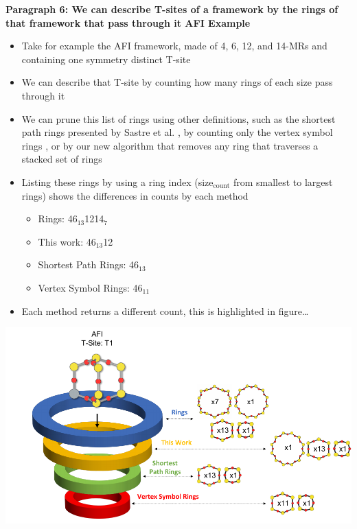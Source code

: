 \documentclass[11pt]{article}
\begin{document}
\textbf{\textbf{Paragraph 6: We can describe T-sites of a framework by the rings of that framework that pass through it AFI Example}}
\begin{itemize}
\item Take for example the AFI framework, made of 4, 6, 12, and 14-MRs and containing one symmetry distinct T-site
\item We can describe that T-site by counting how many rings of each size pass through it
\item We can prune this list of rings using other definitions, such as the shortest path rings presented by Sastre et al. \cite{sastre-topological-2009}, by counting only the vertex symbol rings \cite{okeeffe-vertex-1997}, or by our new algorithm that removes any ring that traverses a stacked set of rings
\item Listing these rings by using a ring index (size\(_{\text{count}}\) from smallest to largest rings) \cite{sastre-topological-2009} shows the differences in counts by each method
\begin{itemize}
\item Rings: 4\textbullet{}6\(_{\text{13}}\)\textbullet{}12\textbullet{}14\(_{\text{7}}\)
\item This work: 4\textbullet{}6\(_{\text{13}}\)\textbullet{}12
\item Shortest Path Rings: 4\textbullet{}6\(_{\text{13}}\)
\item Vertex Symbol Rings: 4\textbullet{}6\(_{\text{11}}\)
\end{itemize}
\item Each method returns a different count, this is highlighted in figure\ldots{}
\end{itemize}
\begin{center}
\includegraphics[width=.6\textwidth]{../figures/completed-figures/afi-funnel.pdf}
\end{center}
\end{document}

